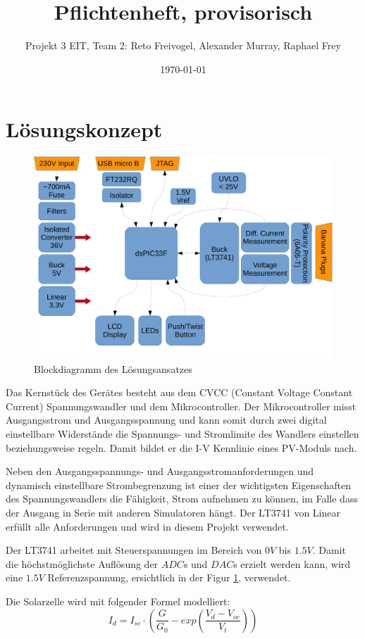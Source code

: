 \documentclass{article}
\title{Pflichtenheft, provisorisch}
\date{\today}
\author{Projekt 3 EIT, Team 2: Reto Freivogel, Alexander Murray, Raphael Frey}
\begin{document}
\maketitle

\section{L\"osungskonzept}
\begin{figure}[h!]
    \begin{centering}
    \includegraphics[width=.667\textwidth]{grob-blockdiagramm.pdf}
    \caption{Blockdiagramm des L\"osungsansatzes}
    \end{centering}
    \label{fig:grob-blockschaltbild}
\end{figure}

Das Kernst\"uck des Ger\"ates besteht  aus dem CVCC (Constant Voltage Constant
Current) Spannungswandler  und dem Mikrocontroller. Der  Mikrocontroller misst
Ausgangsstrom  und   Ausgangsspannung  und  kann  somit   durch  zwei  digital
einstellbare  Widerst\"ande  die  Spannungs-   und  Stromlimite  des  Wandlers
einstellen  beziehungsweise regeln. Damit  bildet er  die I-V  Kennlinie eines
PV-Moduls nach.

Neben den Ausgangsspannungs- und Ausgangsstromanforderungen und dynamisch
einstellbare Strombegrenzung ist einer der wichtigsten Eigenschaften des
Spannungswandlers die F\"ahigkeit, Strom aufnehmen zu k\"onnen, im Falle dass
der Ausgang in Serie mit anderen Simulatoren h\"angt. Der LT3741 von Linear
erf\"ullt alle Anforderungen und wird in diesem Projekt verwendet.

Der LT3741 arbeitet mit Steuerspannungen im Bereich von $0V$ bis $1.5V$. Damit
die h\"ochstm\"oglichste Aufl\"osung der $ADC$s und $DAC$s erzielt werden kann,
wird eine $1.5V$ Referenzspannung, ersichtlich in der Figur
\ref{fig:grob-blockschaltbild}, verwendet.

Die Solarzelle wird mit folgender Formel modelliert:
\begin{equation}
I_d = I_{sc} \cdot \left(\frac{G}{G_0} - exp\left(\frac{V_d-V_{oc}}{V_t}\right)\right)
\end{equation}
\end{document}
